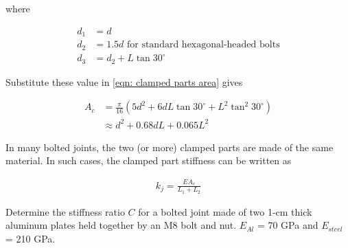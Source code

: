 \documentclass[
10pt,
a4paper,
openany,
svgnames,
]{book}
\begin{document}
where 

\begin{align*}
  d_1 &= d \\
  d_2 &= 1.5d \text{ for standard hexagonal-headed bolts} \\
  d_3 &= d_2 + L \tan 30^{\circ} 
\end{align*}

Substitute these value in \cref{eqn: clamped parts area} gives

\begin{align}
  A_c &= \frac{\pi}{16}(5d^2 + 6dL \tan 30^{\circ} + L^2 \tan^2 30^{\circ}) \nonumber \\
      &\approx d^2 + 0.68dL + 0.065L^2 \label{eqn: clamped parts area approx}
\end{align}

In many bolted joints, the two (or more) clamped parts are made of the same material. In such cases, the clamped part stiffness can be written as

\begin{align}
  k_j = \frac{EA_c}{L_1+L_2}
\end{align}

\begin{example} Determine the stiffness ratio $C$ for a bolted joint made of two 1-cm thick aluminum plates held together by an M8 bolt and nut. $E_{Al}$ = 70 GPa and $E_{steel}$ = 210 GPa.
\end{example}
\end{document}
